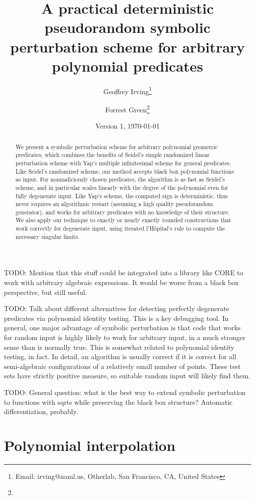 \documentclass[11pt]{article}
\title{A practical deterministic pseudorandom symbolic perturbation scheme for arbitrary polynomial predicates}
\author{Geoffrey Irving\thanks{Email: irving@naml.us, Otherlab, San Francisco, CA, United States}
\and Forrest Green\thanks{\TODO}}
\date{Version 1, \today}
\newcommand{\TODO}{{\color{red} TODO}}
\begin{document}
\maketitle

\begin{abstract}
We present a symbolic perturbation scheme for arbitrary polynomial geometric predicates, which combines the benefits of
Seidel's simple randomized linear perturbation scheme with Yap's multiple infinitesimal scheme for general predicates.
Like Seidel's randomized scheme, our method accepts black box polynomial functions as input.
For nonmaliciously chosen predicates, the algorithm is as fast as Seidel's scheme, and in particular scales linearly
with the degree of the polynomial even for fully degenerate input.  Like Yap's scheme, the computed sign is deterministic,
thus never requires an algorithmic restart (assuming a high quality pseudorandom generator), and works for arbitrary
predicates with no knowledge of their structure.  We also apply our technique to exactly or nearly exactly rounded
constructions that work correctly for degenerate input, using iterated l'H\^opital's rule to compute the necessary
singular limits.
\end{abstract}

\TODO: Mention that this stuff could be integrated into a library like CORE to work with arbitrary algebraic expressions.
It would be worse from a black box perspective, but still useful.

\TODO: Talk about different alternatives for detecting perfectly degenerate predicates via polynomial identity testing.  This is a key debugging tool.  In general, one major advantage of symbolic perturbation is that code that works for random input is highly likely to work for arbitrary input, in a much stronger sense than is normally true.  This is somewhat related to polynomial identity testing, in fact.
In detail, an algorithm is usually correct if it is correct for all semi-algebraic configurations of a relatively small number of points.  These test sets have strictly positive measure, so suitable random input will likely find them.

\TODO: General question: what is the best way to extend symbolic perturbation to functions with sqrts while preserving the black box structure?  Automatic differentiation, probably.

\section{Polynomial interpolation}
\end{document}
